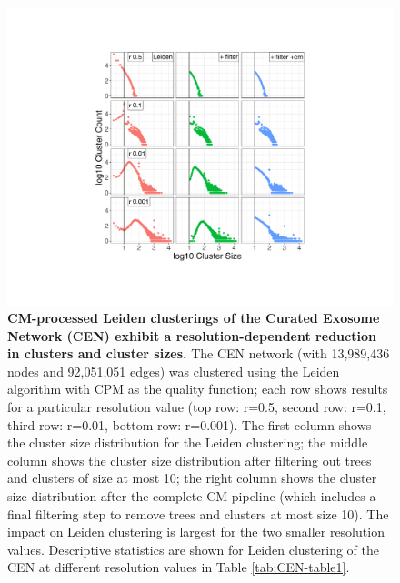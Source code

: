 \documentclass[11pt]{article}   	%
\begin{document}
\begin{figure}[H]
\centering
\includegraphics[width=0.8\linewidth]{figs/fig2_kn.pdf}
\caption{\textbf{CM-processed Leiden clusterings of the Curated Exosome Network (CEN) exhibit a resolution-dependent reduction in clusters and cluster sizes.}
The CEN network (with 13,989,436 nodes and 92,051,051 edges) was clustered using the Leiden algorithm with CPM as the quality function; each row shows results for a particular resolution value (top row: r=0.5, second row: r=0.1, third row: r=0.01, bottom row: r=0.001).
The first column shows the cluster size distribution for the Leiden clustering; the middle column shows the cluster size distribution after filtering out trees and clusters of size at most 10; the right column shows the cluster size distribution after the complete CM pipeline (which includes a final filtering step to remove trees and clusters at most size 10).
The impact on Leiden clustering is largest for the two smaller resolution values.
Descriptive statistics are shown for Leiden clustering of the CEN at different resolution values in Table \ref{tab:CEN-table1}.}
\label{fig:CEN_size_count_plots_leiden}
\end{figure}
\end{document}
